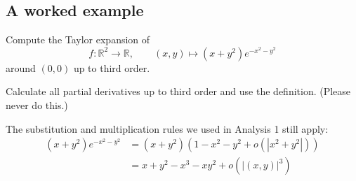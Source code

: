 \subsection{A worked example}

\begin{exercise}
\label{ex:taylor_explicit_example}
Compute the Taylor expansion of
\[f : \mathbb{R}^2\to\mathbb{R}, \qquad (x,y) \mapsto (x+y^2)e^{-x^2-y^2}\]
around $(0,0)$ up to third order.
\end{exercise}

\begin{exercisesolution}
Calculate all partial derivatives up to third order and use the definition. (Please never do
this.)
\end{exercisesolution}

\begin{exercisesolution}
The substitution and multiplication rules we used in Analysis 1 still apply:
\[
\begin{aligned}
(x+y^2)e^{-x^2-y^2} &= (x+y^2)\left(1 - x^2 - y^2 + o(|x^2+y^2|)\right) \\
&= x + y^2 - x^3 - xy^2 + o\!\left(|(x,y)|^3\right)
\end{aligned}
\]
\end{exercisesolution}

